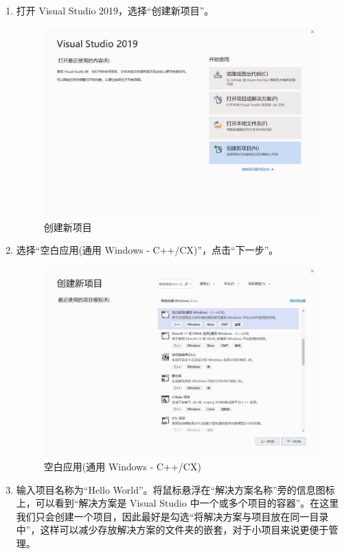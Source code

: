 \begin{enumerate}
    \item 打开 Visual Studio 2019，选择``创建新项目''。
    \begin{figure}[htbp]
        \centering
        \includegraphics[width = 0.5\paperwidth]{pic/2.png}
        \caption{创建新项目}
    \end{figure}

    \item 选择``空白应用(通用 Windows - C++/CX)''，点击``下一步''。
    \begin{figure}[htbp]
        \centering
        \includegraphics[width = 0.5\paperwidth]{pic/3.png}
        \caption{空白应用(通用 Windows - C++/CX)}
    \end{figure}

    \item 输入项目名称为``Hello World''。将鼠标悬浮在``解决方案名称''旁的信息图标上，可以看到``解决方案是 Visual Studio 中一个或多个项目的容器''。在这里我们只会创建一个项目，因此最好是勾选``将解决方案与项目放在同一目录中''，这样可以减少存放解决方案的文件夹的嵌套，对于小项目来说更便于管理。


\end{enumerate}
